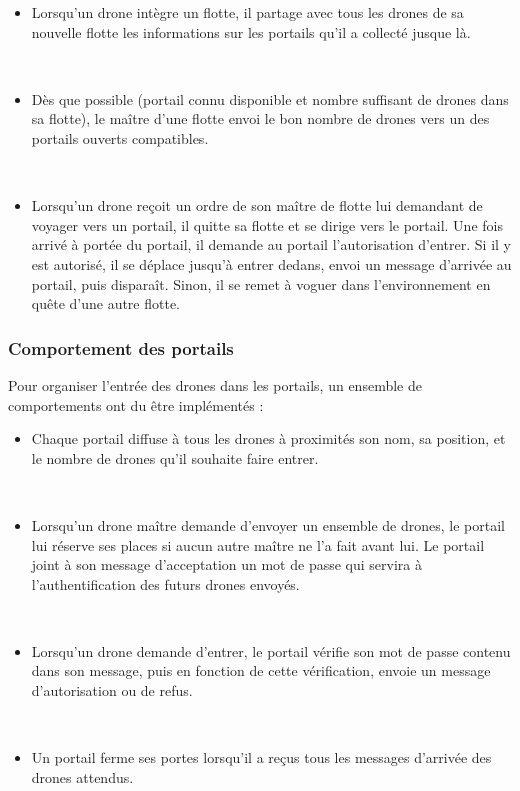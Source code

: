 \documentclass[11pt]{report}
\begin{document}
\begin{itemize}
~\
\item Lorsqu'un drone intègre un flotte, il partage avec tous les drones de sa nouvelle flotte les informations sur les portails qu'il a collecté jusque là.

~\
\item Dès que possible (portail connu disponible et nombre suffisant de drones dans sa flotte), le maître d'une flotte envoi le bon nombre de drones vers un des portails ouverts compatibles.

~\
\item Lorsqu'un drone reçoit un ordre de son maître de flotte lui demandant de voyager vers un portail, il quitte sa flotte et se dirige vers le portail. Une fois arrivé à portée du portail, il demande au portail l'autorisation d'entrer. Si il y est autorisé, il se déplace jusqu'à entrer dedans, envoi un message d'arrivée au portail, puis disparaît. Sinon, il se remet à voguer dans l'environnement en quête d'une autre flotte.
\end{itemize}

\subsubsection{Comportement des portails}

Pour organiser l'entrée des drones dans les portails, un ensemble de comportements ont du être implémentés : 

\begin{itemize}

\item Chaque portail diffuse à tous les drones à proximités son nom, sa position, et le nombre de drones qu'il souhaite faire entrer.

~\
\item Lorsqu'un drone maître demande d'envoyer un ensemble de drones, le portail lui réserve ses places si aucun autre maître ne l'a fait avant lui. Le portail joint à son message d'acceptation un mot de passe qui servira à l'authentification des futurs drones envoyés.

~\
\item Lorsqu'un drone demande d'entrer, le portail vérifie son mot de passe contenu dans son message, puis en fonction de cette vérification, envoie un message d'autorisation ou de refus.

~\
\item Un portail ferme ses portes lorsqu'il a reçus tous les messages d'arrivée des drones attendus.
\end{itemize}
\end{document}
